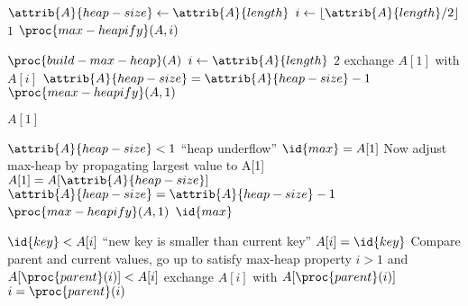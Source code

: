 \documentclass{article}
\begin{document}
\begin{codebox}
\li $\attrib{A}{heap-size} \gets \attrib{A}{length}$ 
\li \For $i \gets \lfloor \attrib{A}{length}/2 \rfloor$ \Downto $1$
\li \Do
        $\proc{max-heapify}(A, i)$
    \End
\end{codebox}

\begin{codebox}
\li $\proc{build-max-heap}(A)$
\li \For $i \gets \attrib{A}{length}$ \Downto $2$
\li \Do
        exchange $A[1]$ with $A[i]$
\li     $\attrib{A}{heap-size} = \attrib{A}{heap-size} - 1$
\li     $\proc{meax-heapify}(A, 1)$
    \End
\end{codebox}

\begin{codebox}
\li \Return $A[1]$
\end{codebox}

\begin{codebox}
\li \If $\attrib{A}{heap-size} < 1$
\li \Then
        \Error ``heap underflow''
    \End
\li $\id{max} = A[1]$
\li \Comment Now adjust max-heap by propagating largest value to A[1]
\li $A[1] = A[\attrib{A}{heap-size}]$
\li $\attrib{A}{heap-size} = \attrib{A}{heap-size} - 1$
\li $\proc{max-heapify}(A, 1)$
\li \Return $\id{max}$
\end{codebox}

\begin{codebox}
\li \If $\id{key} < A[i]$
\li \Then
        \Error ``new key is smaller than current key''
    \End
\li $A[i] = \id{key}$
\li \Comment Compare parent and current values, go up to satisfy max-heap property
\li \While $i >  1$ and $A[\proc{parent}(i)] < A[i]$
\li \Do
        exchange $A[i]$ with $A[\proc{parent}(i)]$
\li     $i = \proc{parent}(i)$
    \End
\end{codebox}
\end{document}
